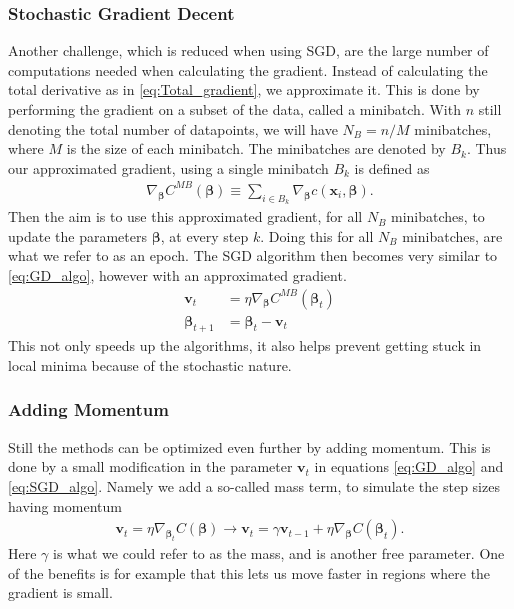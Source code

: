 \documentclass[12pt]{extarticle}
\begin{document}
\subsubsection{Stochastic Gradient Decent}
Another challenge, which is reduced when using SGD, are the large number of computations needed when calculating the gradient. Instead of calculating the total derivative as in \eqref{eq:Total_gradient}, we approximate it. This is done by performing the gradient on a subset of the data, called a minibatch. With $n$ still denoting the total number of datapoints, we will have $N_B=n/M$ minibatches, where $M$ is the size of each minibatch. The minibatches are denoted by $B_k$. Thus our approximated gradient, using a single minibatch $B_k$ is defined as
\begin{align}
\nabla_{\boldsymbol{\beta}} C^{MB}(\boldsymbol{\beta}) \equiv \sum_{i \in B_k} \nabla_{\boldsymbol{\beta}} c(\mathbf{x}_i, \boldsymbol{\beta}).
\end{align}
Then the aim is to use this approximated gradient, for all $N_B$ minibatches, to update the parameters $\boldsymbol{\beta}$, at every step $k$. Doing this for all $N_B$ minibatches, are what we refer to as an epoch. The SGD algorithm then becomes very similar to \eqref{eq:GD_algo}, however with an approximated gradient.
\begin{align}
\mathbf{v}_t &= \eta\nabla_{\boldsymbol{\beta}} C^{MB}(\boldsymbol{\beta}_t) \nonumber \\
\boldsymbol{\beta}_{t+1} &= \boldsymbol{\beta}_t - \mathbf{v}_t
\label{eq:SGD_algo}
\end{align}
This not only speeds up the algorithms, it also helps prevent getting stuck in local minima because of the stochastic nature.

\subsubsection{Adding Momentum}
Still the methods can be optimized even further by adding momentum. This is done by a small modification in the parameter $\mathbf{v}_t$ in equations \eqref{eq:GD_algo} and \eqref{eq:SGD_algo}. Namely we add a so-called mass term, to simulate the step sizes having momentum
\begin{align}
	\mathbf{v}_t = \eta \nabla_{\boldsymbol{\beta}_t} C(\boldsymbol{\beta}) \rightarrow \mathbf{v}_t = \gamma \mathbf{v}_{t-1} + \eta \nabla_{\boldsymbol{\beta}} C(\boldsymbol{\beta}_t).
\end{align}
Here $\gamma$ is what we could refer to as the mass, and is another free parameter. One of the benefits is for example that this lets us move faster in regions where the gradient is small.
\end{document}
